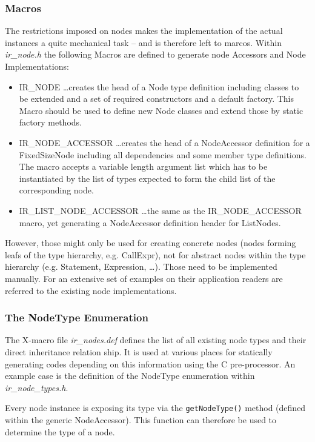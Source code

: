 \subsubsection{Macros}
The restrictions imposed on nodes makes the implementation of the actual
instances a quite mechanical task -- and is therefore left to marcos. Within
\textit{ir\_node.h} the following Macros are defined to generate node Accessors
and Node Implementations: 
\begin{itemize}
  \item IR\_NODE \ldots creates the head of a Node
  type definition including classes to be extended and a set of required constructors and a default
  factory. This Macro should be used to define new Node classes and extend those
  by static factory methods. 
  \item IR\_NODE\_ACCESSOR \ldots creates
  the head of a NodeAccessor definition for a FixedSizeNode including all
  dependencies and some member type definitions. The macro accepts a variable
  length argument list which has to be instantiated by the list of types
  expected to form the child list of the corresponding node.
  \item IR\_LIST\_NODE\_ACCESSOR \ldots the same as the IR\_NODE\_ACCESSOR
  macro, yet generating a NodeAccessor definition header for ListNodes.
\end{itemize}
However, those might only be used for creating
concrete nodes (nodes forming leafs of the type hierarchy, e.g. CallExpr), not
for abstract nodes within the type hierarchy (e.g. Statement, Expression,
\ldots). Those need to be implemented manually. For an extensive set of examples
on their application readers are referred to the existing node implementations.

\subsubsection{The NodeType Enumeration}
The X-macro file \textit{ir\_nodes.def} defines the list of all existing node
types and their direct inheritance relation ship. It is used at various places
for statically generating codes depending on this information using the C
pre-processor. An example case is the definition of the NodeType enumeration
within \textit{ir\_node\_types.h}. 

Every node instance is exposing its type via the \lstinline|getNodeType()|
method (defined within the generic NodeAccessor). This function can therefore be
used to determine the type of a node.


